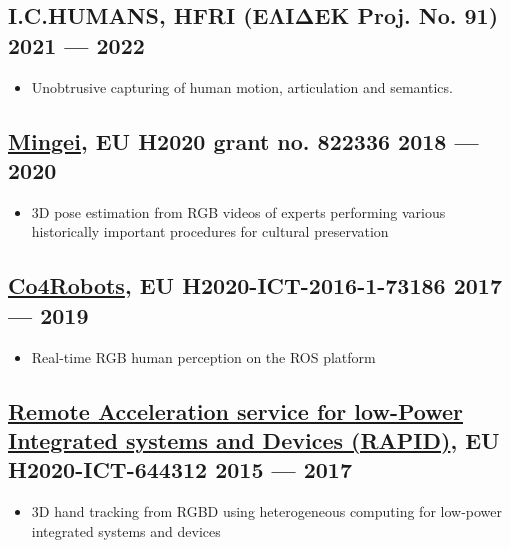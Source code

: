 \documentclass[a4,8pt]{article}
\newenvironment{zitemize}{
\begin{itemize}\itemsep0pt \parskip0pt \parsep1pt}
{\end{itemize}\vspace{-0.5cm}}
\begin{document}
\subsection*{I.C.HUMANS, {\normalsize\normalfont HFRI (ΕΛΙΔΕΚ Proj. No. 91)} \hfill 2021 --- 2022} 
    \begin{zitemize}
        \item Unobtrusive capturing of human motion, articulation and semantics.
    \end{zitemize}

\subsection*{\href{https://www.mingei-project.eu/}{Mingei}, {\normalsize\normalfont EU H2020 grant no. 822336} \hfill 2018 --- 2020} 
    \begin{zitemize}
        \item 3D pose estimation from RGB videos of experts performing various historically important procedures for cultural preservation
    \end{zitemize}

\subsection*{\href{http://www.co4robots.eu/}{Co4Robots}, {\normalsize\normalfont EU H2020-ICT-2016-1-73186 } \hfill 2017 --- 2019} 
    \begin{zitemize}
        \item Real-time RGB human perception on the ROS platform
    \end{zitemize}
    
\subsection*{\href{http://www.rapid-project.eu/}{Remote Acceleration service for low-Power Integrated systems and Devices (RAPID)}, {\normalsize\normalfont EU H2020-ICT-644312 } \hfill 2015 --- 2017} 
    \begin{zitemize}
        \item 3D hand tracking from RGBD using heterogeneous computing for low-power integrated systems and devices
    \end{zitemize}
    
\end{document}
